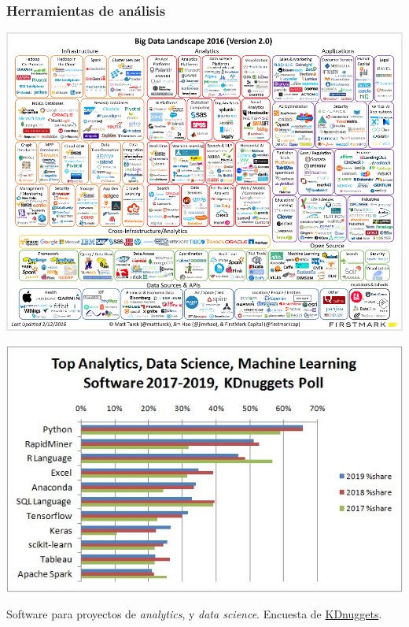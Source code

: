 \documentclass{beamer}
\begin{document}
\begin{frame}[plain]
\frametitle{Herramientas de análisis}

\begin{center}
\includegraphics[width=\textwidth]{big_data_landscape.png}
\end{center}
\end{frame}


\begin{frame}[plain]
\begin{center}
\includegraphics[height=0.75\textheight]{top-analytics-data-science-machine-learning-software-2019-3yrs-590.jpg}
\end{center}
{\footnotesize Software para proyectos de \textit{analytics}, y \textit{data science}. Encuesta de \href{https://www.kdnuggets.com/2019/05/poll-top-data-science-machine-learning-platforms.html}{KDnuggets}.}
\end{frame}
\end{document}
